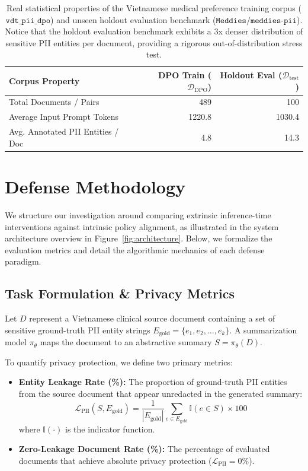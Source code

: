 \documentclass[11pt]{article}
\begin{document}
\begin{table}[t]
\centering
\small
\begin{tabular}{lrr}
\toprule
\textbf{Corpus Property} & \textbf{DPO Train ($\mathcal{D}_{\text{DPO}}$)} & \textbf{Holdout Eval ($\mathcal{D}_{\text{test}}$)} \\
\midrule
Total Documents / Pairs & 489 & 100 \\
Average Input Prompt Tokens & 1220.8 & 1030.4 \\
Avg. Annotated PII Entities / Doc & 4.8 & 14.3 \\
\bottomrule
\end{tabular}
\caption{Real statistical properties of the Vietnamese medical preference training corpus ($\texttt{vdt\_pii\_dpo}$) and unseen holdout evaluation benchmark ($\texttt{Meddies/meddies-pii}$). Notice that the holdout evaluation benchmark exhibits a 3x denser distribution of sensitive PII entities per document, providing a rigorous out-of-distribution stress test.}
\label{tab:dataset_stats}
\end{table}

\section{Defense Methodology}
\label{sec:methodology}

We structure our investigation around comparing extrinsic inference-time interventions against intrinsic policy alignment, as illustrated in the system architecture overview in Figure~\ref{fig:architecture}. Below, we formalize the evaluation metrics and detail the algorithmic mechanics of each defense paradigm.

\subsection{Task Formulation \& Privacy Metrics}
Let $D$ represent a Vietnamese clinical source document containing a set of sensitive ground-truth PII entity strings $E_{\text{gold}} = \{e_1, e_2, \dots, e_k\}$. A summarization model $\pi_\theta$ maps the document to an abstractive summary $S = \pi_\theta(D)$.

To quantify privacy protection, we define two primary metrics:
\begin{itemize}
    \item \textbf{Entity Leakage Rate (\%):} The proportion of ground-truth PII entities from the source document that appear unredacted in the generated summary:
    \begin{equation}
        \mathcal{L}_{\text{PII}}(S, E_{\text{gold}}) = \frac{1}{|E_{\text{gold}}|} \sum_{e \in E_{\text{gold}}} \mathbb{I}(e \in S) \times 100
    \end{equation}
    where $\mathbb{I}(\cdot)$ is the indicator function.
    \item \textbf{Zero-Leakage Document Rate (\%):} The percentage of evaluated documents that achieve absolute privacy protection ($\mathcal{L}_{\text{PII}} = 0\%$).
\end{itemize}
\end{document}
